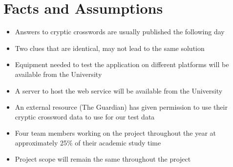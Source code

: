 \section{Facts and Assumptions}

\begin{itemize}
  \item Answers to cryptic crosswords are usually published the following day
  \item Two clues that are identical, may not lead to the same solution
  \item Equipment needed to test the application on different platforms will be
        available from the University
  \item A server to host the web service will be available from the University
  \item An external resource (The Guardian) has given permission to use their 
        cryptic crossword data to use for our test data
  \item Four team members working on the project throughout the year at 
        approximately 25\% of their academic study time
  \item Project scope will remain the same throughout the project
\end{itemize}